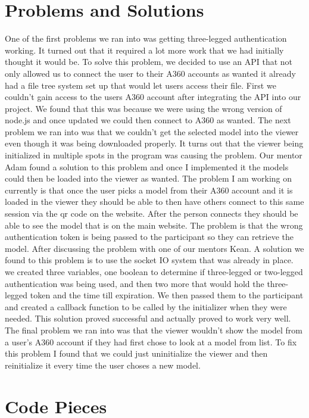 \documentclass[10pt,draftclsnofoot,onecolumn]{IEEEtran}
\begin{document}
\section{Problems and Solutions}
One of the first problems we ran into was getting three-legged authentication working. It turned out that it required a lot more work that we had initially thought it would be. To solve this problem, we decided to use an API that not only allowed us to connect the user to their A360 accounts as wanted it already had a file tree system set up that would let users access their file. First we couldn't gain access to the users A360 account after integrating the API into our project. We found that this was because we were using the wrong version of node.js and once updated we could then connect to A360 as wanted. The next problem we ran into was that we couldn't get the selected model into the viewer even though it was being downloaded properly. It turns out that the viewer being initialized in multiple spots in the program was causing the problem. Our mentor Adam found a solution to this problem and once I implemented it the models could then be loaded into the viewer as wanted. The problem I am working on currently is that once the user picks a model from their A360 account and it is loaded in the viewer they should be able to then have others connect to this same session via the qr code on the website. After the person connects they should be able to see the model that is on the main website. The problem is that the wrong authentication token is being passed to the participant so they can retrieve the model. After discussing the problem with one of our mentors Kean. A solution we found to this problem is to use the socket IO system that was already in place. we created three variables, one boolean to determine if three-legged or two-legged authentication was being used, and then two more that would hold the three-legged token and the time till expiration. We then passed them to the participant and created a callback function to be called by the initializer when they were needed. This solution proved successful and actually proved to work very well. The final problem we ran into was that the viewer wouldn't show the model from a user’s A360 account if they had first chose to look at a model from list. To fix this problem I found that we could just uninitialize the viewer and then reinitialize it every time the user choses a new model.
\section{Code Pieces}
\end{document}
